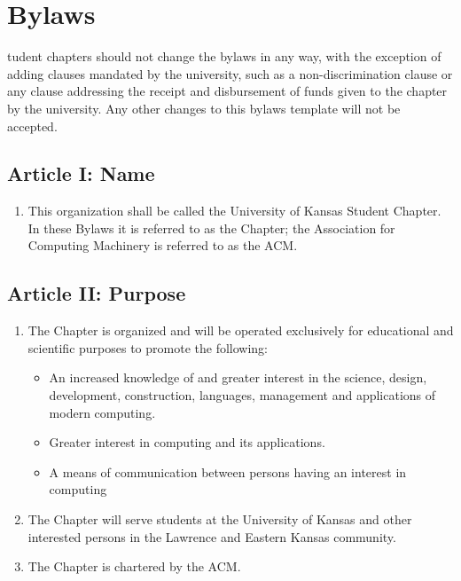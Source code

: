 %
%
\let\textcircled=\pgftextcircled
\chapter{Bylaws}
\label{chap:bylaws}

tudent chapters should not change the bylaws in any way, with the exception of adding clauses mandated by the university, such as a non-discrimination clause or any clause addressing the receipt and disbursement of funds given to the chapter by the university. Any other changes to this bylaws template will not be accepted.


\section*{Article I: Name}
\label{sec:sec01}
\begin{enumerate}
	\item This organization shall be called the University of Kansas Student Chapter. In these Bylaws it is referred to as the Chapter; the Association for Computing Machinery is referred to as the ACM.
\end{enumerate}

\section*{Article II: Purpose}
\begin{enumerate}
	\item The Chapter is organized and will be operated exclusively for educational and scientific purposes to promote the following:
    \begin{itemize}
		\item An increased knowledge of and greater interest in the science, design, development, construction, languages, management and applications of modern computing.
        \item Greater interest in computing and its applications.
        \item A means of communication between persons having an interest in computing
 	\end{itemize}
	\item The Chapter will serve students at the University of Kansas and other interested persons in the Lawrence and Eastern Kansas community.
	\item The Chapter is chartered by the ACM.
\end{enumerate}

